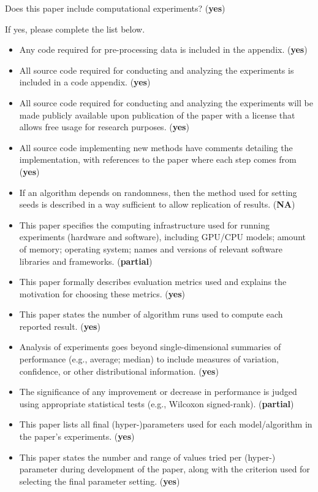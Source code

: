 \documentclass{article}
\begin{document}
\noindent Does this paper include computational experiments? (\textbf{yes})

\noindent If yes, please complete the list below.

\begin{itemize}
    \item Any code required for pre-processing data is included in the appendix. (\textbf{yes})
    \item All source code required for conducting and analyzing the experiments is included in a code appendix. (\textbf{yes})
    \item All source code required for conducting and analyzing the experiments will be made publicly available upon publication of the paper with a license that allows free usage for research purposes. (\textbf{yes})
    \item All source code implementing new methods have comments detailing the implementation, with references to the paper where each step comes from (\textbf{yes})
    \item If an algorithm depends on randomness, then the method used for setting seeds is described in a way sufficient to allow replication of results. (\textbf{NA})
    \item This paper specifies the computing infrastructure used for running experiments (hardware and software), including GPU/CPU models; amount of memory; operating system; names and versions of relevant software libraries and frameworks. (\textbf{partial})
    \item This paper formally describes evaluation metrics used and explains the motivation for choosing these metrics. (\textbf{yes})
    \item This paper states the number of algorithm runs used to compute each reported result. (\textbf{yes})
    \item Analysis of experiments goes beyond single-dimensional summaries of performance (e.g., average; median) to include measures of variation, confidence, or other distributional information. (\textbf{yes})
    \item The significance of any improvement or decrease in performance is judged using appropriate statistical tests (e.g., Wilcoxon signed-rank). (\textbf{partial})
    \item This paper lists all final (hyper-)parameters used for each model/algorithm in the paper's experiments. (\textbf{yes})
    \item This paper states the number and range of values tried per (hyper-) parameter during development of the paper, along with the criterion used for selecting the final parameter setting. (\textbf{yes})
\end{itemize}
\end{document}
